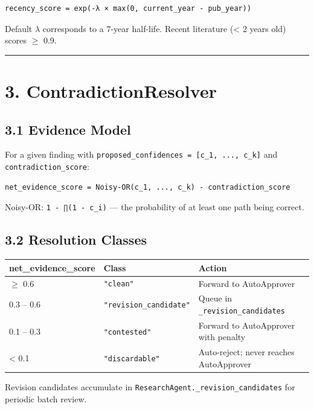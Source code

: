 \begin{lstlisting}
recency_score = exp(-λ × max(0, current_year - pub_year))
\end{lstlisting}

Default \texttt{$\lambda$} corresponds to a 7-year half-life. Recent literature (< 2 years old) scores $\geq$ 0.9.

\medskip\noindent\rule{\linewidth}{0.4pt}\medskip

\section*{3. ContradictionResolver}

\subsection*{3.1 Evidence Model}

For a given finding with \texttt{proposed\_confidences = [c\_1, ..., c\_k]} and \texttt{contradiction\_score}:

\begin{lstlisting}
net_evidence_score = Noisy-OR(c_1, ..., c_k) - contradiction_score
\end{lstlisting}

Noisy-OR: \texttt{1 - ∏(1 - c\_i)} --- the probability of at least one path being correct.

\subsection*{3.2 Resolution Classes}

\begin{table}[h]
\small\centering
\begin{tabular}{lll}
\toprule
net_evidence_score & Class & Action \\
\midrule
$\geq$ 0.6 & \texttt{"clean"} & Forward to AutoApprover \\
0.3 -- 0.6 & \texttt{"revision\_candidate"} & Queue in \texttt{\_revision\_candidates} \\
0.1 -- 0.3 & \texttt{"contested"} & Forward to AutoApprover with penalty \\
< 0.1 & \texttt{"discardable"} & Auto-reject; never reaches AutoApprover \\
\bottomrule
\end{tabular}
\end{table}


Revision candidates accumulate in \texttt{ResearchAgent.\_revision\_candidates} for periodic batch review.

